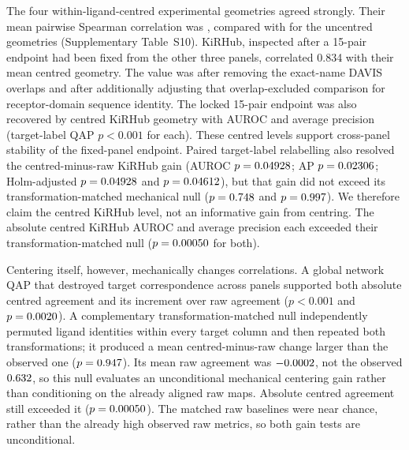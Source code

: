 \documentclass[11pt]{article}
\begin{document}
The four within-ligand-centred experimental geometries agreed strongly. Their mean pairwise
Spearman correlation was \CrossPanelCentered{}, compared with \CrossPanelRaw{} for the
uncentred geometries (Supplementary Table~S10). KiRHub, inspected after
a 15-pair endpoint
had been fixed from the other three panels, correlated 0.834 with their mean centred
geometry. The value was \KiRHubOverlapExcludedRho{} after removing the
\KiRHubDavisNameOverlap{} exact-name DAVIS overlaps and
\KiRHubOverlapExcludedAdjustedRho{}
after additionally adjusting that overlap-excluded comparison for receptor-domain sequence
identity. The locked 15-pair endpoint was also recovered by centred KiRHub geometry with
AUROC \KiRHubLockedAUROC{} and average precision \KiRHubLockedAP{} (target-label QAP
$p<0.001$ for each). These centred levels support cross-panel stability of the fixed-panel
endpoint. Paired target-label relabelling also resolved the centred-minus-raw KiRHub gain
(AUROC $p=0.04928{}$; AP $p=0.02306{}$; Holm-adjusted
$p=0.04928{}$ and $p=0.04612{}$), but that gain did not exceed its
transformation-matched mechanical null ($p=0.748{}$ and
$p=0.997{}$). We therefore claim the centred KiRHub level, not an informative
gain from centring. The absolute centred KiRHub AUROC and average precision each exceeded
their transformation-matched null ($p=0.00050{}$ for both).

Centering itself, however, mechanically changes correlations. A global network QAP that
destroyed target correspondence across panels supported both absolute centred agreement
and its increment over raw agreement ($p<0.001$ and $p=0.0020{}$). A
complementary
transformation-matched null independently permuted ligand identities within every target
column and then repeated both transformations; it produced a mean centred-minus-raw change
larger than the observed one ($p=0.947{}$). Its mean raw agreement was
$-0.0002{}$, not the observed $0.632{}$, so this null evaluates
an unconditional mechanical centering gain rather than conditioning on the already aligned
raw maps. Absolute centred agreement still exceeded it
($p=0.00050{}$). The matched raw baselines were near chance,
rather than the already high observed raw metrics, so both gain tests are unconditional.
\end{document}
